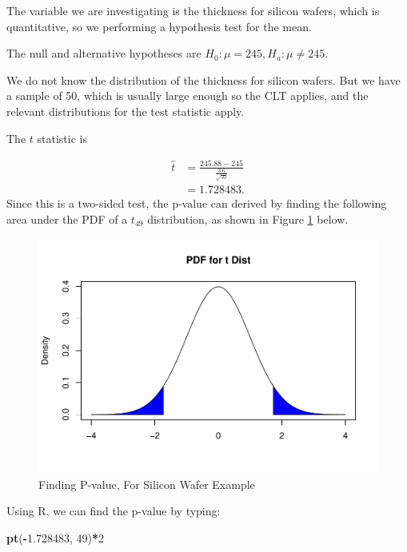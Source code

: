 \documentclass[
]{book}
\newenvironment{Shaded}{\begin{snugshade}}{\end{snugshade}}
\newcommand{\DecValTok}[1]{\textcolor[rgb]{0.00,0.00,0.81}{#1}}
\newcommand{\FloatTok}[1]{\textcolor[rgb]{0.00,0.00,0.81}{#1}}
\newcommand{\FunctionTok}[1]{\textcolor[rgb]{0.13,0.29,0.53}{\textbf{#1}}}
\newcommand{\NormalTok}[1]{#1}
\newcommand{\SpecialCharTok}[1]{\textcolor[rgb]{0.81,0.36,0.00}{\textbf{#1}}}
\begin{document}
The variable we are investigating is the thickness for silicon wafers, which is quantitative, so we performing a hypothesis test for the mean.

The null and alternative hypotheses are \(H_0: \mu = 245, H_a: \mu \neq 245\).

We do not know the distribution of the thickness for silicon wafers. But we have a sample of 50, which is usually large enough so the CLT applies, and the relevant distributions for the test statistic apply.

The \(t\) statistic is

\[
\begin{split}
\hat{t} &= \frac{245.88 - 245}{\frac{3.6}{\sqrt{50}}} \\
        &= 1.728483.
\end{split}
\]
Since this is a two-sided test, the p-value can derived by finding the following area under the PDF of a \(t_{49}\) distribution, as shown in Figure \ref{fig:9-pvalworked} below.

\begin{figure}
\centering
\includegraphics{bookdown-demo_files/figure-latex/9-pvalworked-1.pdf}
\caption{\label{fig:9-pvalworked}Finding P-value, For Silicon Wafer Example}
\end{figure}

Using R, we can find the p-value by typing:

\begin{Shaded}
\begin{Highlighting}[]
\FunctionTok{pt}\NormalTok{(}\SpecialCharTok{{-}}\FloatTok{1.728483}\NormalTok{, }\DecValTok{49}\NormalTok{)}\SpecialCharTok{*}\DecValTok{2} 
\end{Highlighting}
\end{Shaded}
\end{document}
